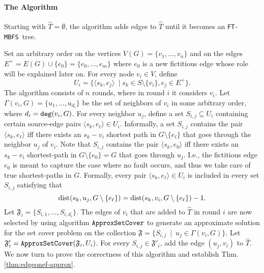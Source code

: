 \documentclass[12pt]{article}
\def\deg{\mbox{\tt deg}}
\def\Set{\mathfrak{F}}
\newcommand{\dist}{\mbox{\rm dist}}
\def\FTMBFS{\mbox{\tt FT-MBFS}}
\def\ApproxSetCover{\mbox{\tt ApproxSetCover}}
\begin{document}
\paragraph{The Algorithm}
Starting with $\widehat{T}=\emptyset$, the algorithm adds edges to $\widehat{T}$ until it becomes an \FTMBFS\ tree.
\par Set an arbitrary order on the vertices
$V(G)=\{v_1, \ldots, v_{n}\}$ and on the edges
$E^+=E(G) \cup \{e_0\}=\{e_0, \ldots, e_m\}$ where $e_0$ is a new fictitious edge whose role will be explained later on.
For every node $v_i \in V$, define
$$U_i=\{ \langle s_k, e_j \rangle ~\mid s_k \in S \setminus \{v_i\},e_j \in E^{+}\}.$$
The algorithm consists of $n$ rounds, where in round $i$
it considers $v_i$. Let $\Gamma(v_i, G)=\{u_1, \ldots, u_{d_i}\}$
be the set of neighbors of $v_i$ in some arbitrary order, where $d_i=\deg(v_i,G)$. For every neighbor $u_j$, define a set $S_{i,j} \subseteq U_i$ containing certain source-edge pairs $\langle s_k, e_\ell \rangle \in U_i$. Informally, a set $S_{i,j}$ contains the pair  $\langle s_k, e_\ell \rangle$ iff there exists an $s_k-v_i$ shortest path in $G \setminus \{e_\ell\}$ that goes through the neighbor $u_j$ of $v_i$.
Note that $S_{i,j}$ contains the pair  $\langle s_k, e_0 \rangle$
iff there exists an $s_k-v_i$ shortest-path in $G \setminus \{e_0\}=G$ that goes through $u_j$. I.e., the fictitious edge $e_0$ is meant to capture the case where no fault occurs, and thus we take care of true shortest-paths in $G$. Formally, every pair $\langle s_k, e_\ell \rangle \in U_i$ is included
in every set $S_{i,j}$ satisfying that
\begin{equation}
\label{eq:intset}
\dist(s_k, u_j, G \setminus \{e_\ell\})=\dist(s_k, v_i, G \setminus \{e_\ell\})-1.
\end{equation}
Let $\Set_i=\{S_{i,1}, \ldots, S_{i,d_i}\}$.
The edges of $v_i$ that are added to $\widehat{T}$ in round $i$ are now selected by using algorithm $\ApproxSetCover$ to generate an approximate solution for the set cover problem on the collection $\Set=\{S_{i,j}~\mid~ u_j \in \Gamma(v_i, G)\}$.
Let $\Set'_i=\ApproxSetCover(\Set_i,U_i)$.
For every $S_{i,j}\in \Set'_i$, add the edge
$(u_j,v_i)$ to $\widehat{T}$.
We now turn to prove the correctness of this algorithm
and establish Thm. \ref{thm:edgeonef-approx}.
\end{document}
